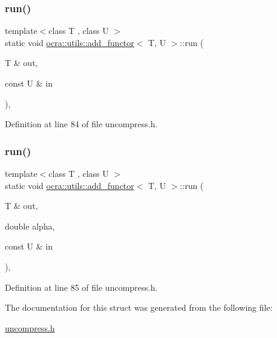 \subsubsection{\texorpdfstring{run()}{run()}\hspace{0.1cm}{\footnotesize\ttfamily [1/2]}}
{\footnotesize\ttfamily template$<$class T , class U $>$ \\
static void \hyperlink{structocra_1_1utils_1_1add__functor}{ocra\+::utils\+::add\+\_\+functor}$<$ T, U $>$\+::run (\begin{DoxyParamCaption}\item[{T \&}]{out,  }\item[{const U \&}]{in }\end{DoxyParamCaption})\hspace{0.3cm}{\ttfamily [inline]}, {\ttfamily [static]}}



Definition at line 84 of file uncompress.\+h.

\hypertarget{structocra_1_1utils_1_1add__functor_a1a9206cb5192b4a1314d5e93afef9c27}{}\label{structocra_1_1utils_1_1add__functor_a1a9206cb5192b4a1314d5e93afef9c27} 
\subsubsection{\texorpdfstring{run()}{run()}\hspace{0.1cm}{\footnotesize\ttfamily [2/2]}}
{\footnotesize\ttfamily template$<$class T , class U $>$ \\
static void \hyperlink{structocra_1_1utils_1_1add__functor}{ocra\+::utils\+::add\+\_\+functor}$<$ T, U $>$\+::run (\begin{DoxyParamCaption}\item[{T \&}]{out,  }\item[{double}]{alpha,  }\item[{const U \&}]{in }\end{DoxyParamCaption})\hspace{0.3cm}{\ttfamily [inline]}, {\ttfamily [static]}}



Definition at line 85 of file uncompress.\+h.



The documentation for this struct was generated from the following file\+:\begin{DoxyCompactItemize}
\item 
\hyperlink{uncompress_8h}{uncompress.\+h}\end{DoxyCompactItemize}
